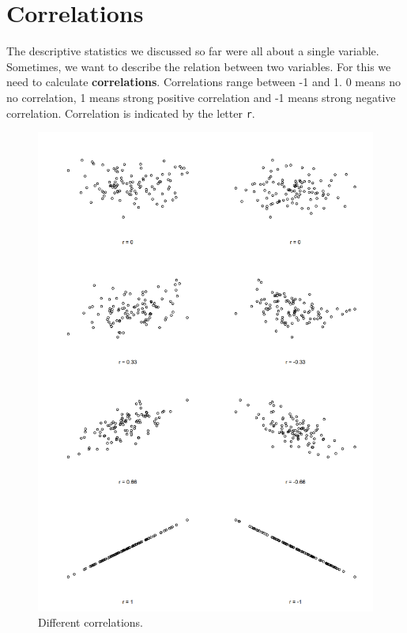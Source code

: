 \documentclass[
]{book}
\begin{document}
\section{Correlations}\label{correlations}

The descriptive statistics we discussed so far were all about a single variable. Sometimes, we want to describe the relation between two variables. For this we need to calculate \textbf{correlations}. Correlations range between -1 and 1. 0 means no no correlation, 1 means strong positive correlation and -1 means strong negative correlation. Correlation is indicated by the letter \texttt{r}.

\begin{figure}
\centering
\includegraphics{./img/corr-1.png}
\caption{\label{fig:correlations}Different correlations.}
\end{figure}
\end{document}
